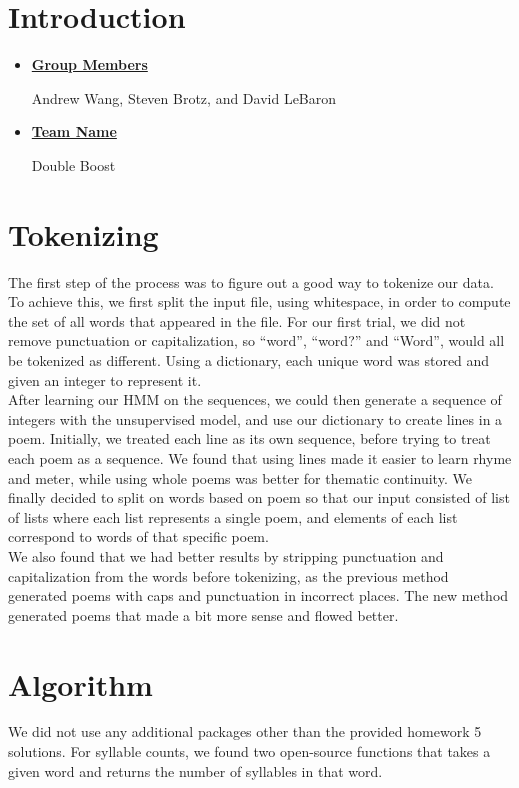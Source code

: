 \documentclass[11pt]{article}
\begin{document}
\pagestyle{fancy}

\section*{Introduction}
\begin{itemize}
\item \underline{\textbf{Group Members}}

Andrew Wang, Steven Brotz, and David LeBaron
\item \underline{\textbf{Team Name}}

Double Boost
\end{itemize}

\section*{Tokenizing}
The first step of the process was to figure out a good way to tokenize our data. To achieve this, we first split the input file, using whitespace, in order to compute the set of all words that appeared in the file. For our first trial, we did not remove punctuation or capitalization, so “word”, “word?” and “Word”, would all be tokenized as different. Using a dictionary, each unique word was stored and given an integer to represent it. \\

\noindent After learning our HMM on the sequences, we could then generate a sequence of integers with the unsupervised model, and use our dictionary to create lines in a poem. Initially, we treated each line as its own sequence, before trying to treat each poem as a sequence. We found that using lines made it easier to learn rhyme and meter, while using whole poems was better for thematic continuity. We finally decided to split on words based on poem so that our input consisted of list of lists where each list represents a single poem, and elements of each list correspond to words of that specific poem. \\

\noindent We also found that we had better results by stripping punctuation and capitalization from the words before tokenizing, as the previous method generated poems with caps and punctuation in incorrect places. The new method generated poems that made a bit more sense and flowed better.

\section*{Algorithm}
We did not use any additional packages other than the provided homework 5 solutions. For syllable counts, we found two open-source functions that takes a given word and returns the number of syllables in that word. \\
\end{document}
